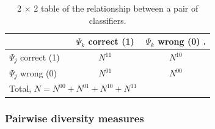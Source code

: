   \begin{table}[!ht]
 \centering \scriptsize
 \caption{2 $\times$ 2 table of the relationship between a pair of classifiers.}
\label{classifier.relation}
\begin{tabular}{l|cc}
\hline
 & $\Psi_k$ correct (1) & $\Psi_k$ wrong (0)  .\\ \hline

$\Psi_{j}$ correct (1)  & $N^{11}$ & $N^{10}$  \\
$\Psi_{j}$ wrong (0)  & $N^{01}$& $N^{00}$ \\ \hline
\multicolumn{2}{c}{Total, $N=N^{00} + N^{01} + N^{10}+ N^{11} $} & \\

\hline
\end{tabular}
\end{table}   


\subsubsection{Pairwise diversity measures}

